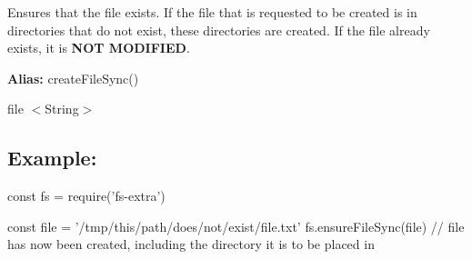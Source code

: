 Ensures that the file exists. If the file that is requested to be created is in directories that do not exist, these directories are created. If the file already exists, it is {\bfseries N\+OT M\+O\+D\+I\+F\+I\+ED}.

{\bfseries Alias\+:} {\ttfamily create\+File\+Sync()}


\begin{DoxyItemize}
\item {\ttfamily file} {\ttfamily $<$String$>$}
\end{DoxyItemize}

\subsection*{Example\+:}


\begin{DoxyCode}
const fs = require('fs-extra')

const file = '/tmp/this/path/does/not/exist/file.txt'
fs.ensureFileSync(file)
// file has now been created, including the directory it is to be placed in
\end{DoxyCode}
 